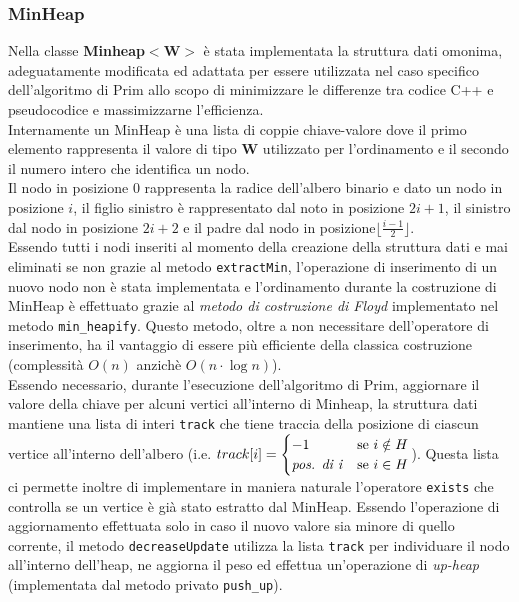 \documentclass[]{article}
\begin{document}
\subsubsection{MinHeap}
Nella classe \textbf{Minheap$<$W$>$} è stata implementata la struttura dati omonima, adeguatamente modificata ed adattata per essere utilizzata nel caso specifico dell'algoritmo di Prim allo scopo di minimizzare le differenze tra codice C++ e pseudocodice e massimizzarne l'efficienza.\\
Internamente un MinHeap è una lista di coppie chiave-valore dove il primo elemento rappresenta il valore di tipo \textbf{W} utilizzato per l'ordinamento e il secondo il numero intero che identifica un nodo.\\
Il nodo in posizione 0 rappresenta la radice dell'albero binario e dato un nodo in posizione $i$, il figlio sinistro è rappresentato dal noto in posizione $2i+1$, il sinistro dal nodo in posizione $2i+2$ e il padre dal nodo in posizione$\lfloor \frac{i-1}{2}\rfloor$.\\
Essendo tutti i nodi inseriti al momento della creazione della struttura dati e mai eliminati se non grazie al metodo \verb|extractMin|, l'operazione di inserimento di un nuovo nodo non è stata implementata e l'ordinamento durante la costruzione di MinHeap è effettuato grazie al \textit{metodo di costruzione di Floyd} implementato nel metodo \verb|min_heapify|. Questo metodo, oltre a non necessitare dell'operatore di inserimento, ha il vantaggio di essere più efficiente della classica costruzione (complessità $O(n)$ anzichè $O(n\cdot\log n)$).\\
Essendo necessario, durante l'esecuzione dell'algoritmo di Prim, aggiornare il valore della chiave per alcuni vertici all'interno di Minheap, la struttura dati mantiene una lista di interi \verb|track| che tiene traccia della posizione di ciascun vertice all'interno dell'albero (i.e. $track[i]=\begin{cases}
-1 & \text{se } i \notin H\\
\text{\textit{pos. di i}} & \text{se } i \in H\\
\end{cases}$). Questa lista ci permette inoltre di implementare in maniera naturale l'operatore \verb|exists| che controlla se un vertice è già stato estratto dal MinHeap.
Essendo l'operazione di aggiornamento effettuata solo in caso il nuovo valore sia minore di quello corrente, il metodo \verb|decreaseUpdate| utilizza la lista \verb|track| per individuare il nodo all'interno dell'heap, ne aggiorna il peso ed effettua un'operazione di \textit{up-heap} (implementata dal metodo privato \verb|push_up|). 
\end{document}
